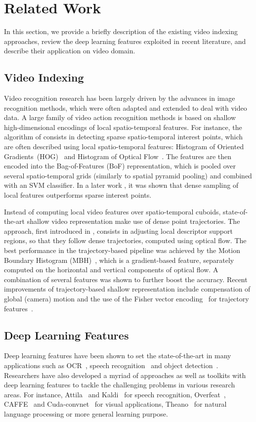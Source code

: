 \documentclass[11pt,twocolumn,twoside]{IEEEtran}
\begin{document}
\section{Related Work}
In this section, we provide a briefly description of the existing video indexing approaches, review the deep learning features exploited in recent literature, and describe their application on video domain.
\subsection{Video Indexing}

Video recognition research has been largely driven by the advances in image recognition methods, which were often adapted and extended to
deal with video data. A large family of video action recognition methods is based on shallow high-dimensional encodings of local
spatio-temporal features. For instance, the algorithm of \cite{Laptev_CVPR08} consists in detecting sparse spatio-temporal interest points, which
are often described using local spatio-temporal features: Histogram of Oriented Gradients~(HOG)~\cite{HOG} and Histogram of Optical Flow~\cite{HOF}.
The features are then encoded into the Bag-of-Features (BoF) representation, which is pooled over several spatio-temporal grids (similarly to spatial
pyramid pooling) and combined with an SVM classifier. In a later work \cite{WangHeng_BMVC09}, it was shown that dense sampling of local features outperforms
sparse interest points.

Instead of computing local video features over spatio-temporal cuboids, state-of-the-art shallow video representation \cite{WangHeng_ICCV13} make use of dense
point trajectories. The approach, first introduced in \cite{WangHeng_CVPR11}, consists in adjusting local descriptor support regions, so that they follow dense
trajectories, computed using optical flow. The best performance in the trajectory-based pipeline was achieved by the Motion Boundary Histogram (MBH)~\cite{HOF}, which is
a gradient-based feature, separately computed on the horizontal and vertical components of optical flow. A combination of several features was shown to further boost
the accuracy. Recent improvements of trajectory-based shallow representation include compensation of global (camera) motion \cite{Jegou13} and the use of
the Fisher vector encoding~\cite{fishervector} for trajectory features~\cite{WangHeng_ICCV13}.

\subsection{Deep Learning Features}
Deep learning features have been shown to set the state-of-the-art in many applications such as
OCR~\cite{YLecun}, speech recognition~\cite{SpeechRecogntion} and object detection~\cite{ImageNet_challenge}.
Researchers have also developed a myriad of approaches as well as toolkits with deep learning features to tackle the challenging problems in various research areas.
For instance, Attila~\cite{Attila} and Kaldi~\cite{Kaldi} for speech recognition, Overfeat~\cite{OverFeat}, CAFFE~\cite{CAFFE} and Cuda-convnet~\cite{Alex_NIPS12} for visual applications, Theano~\cite{Theano} for natural language processing or more general learning purpose.
\end{document}
